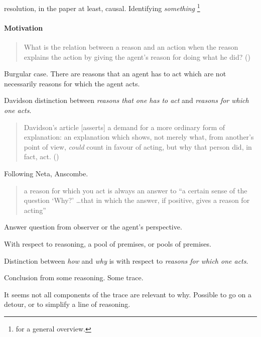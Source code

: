 \begin{note}
  \citeauthor{Davidson:1963aa} resolution, in the \citeyear{Davidson:1963aa} paper at least, causal.
  Identifying \emph{something}%
  \footnote{
    \textcite{Hieronymi:2011aa} for a general overview.
  }
\end{note}

\paragraph*{Motivation}

\begin{note}
  \begin{quote}
    What is the relation between a reason and an action when the reason explains the action by giving the agent's reason for doing what he did?%
    \mbox{}\hfill\mbox{({\citeyear[685]{Davidson:1963aa}})}
  \end{quote}

  Burgular case.
  There are reasons that an agent has to act which are not necessarily reasons for which the agent acts.

  Davidson distinction between \emph{reasons that one has to act} and \emph{reasons for which one acts}.

  \begin{quote}
    Davidson's article [asserts] a demand for a more ordinary form of explanation: an explanation which shows, not merely what, from another's point of view, \emph{could} count in favour of acting, but why that person did, in fact, act.%
    \mbox{}\hfill\mbox{(\citeyear[417]{Hieronymi:2011aa})}
  \end{quote}

  Following Neta, Anscombe.

  \begin{quote}
    a reason for which you act is always an answer to “a certain sense of the question ‘Why?' \dots that in which the answer, if positive, gives a reason for acting”
  \end{quote}

  Answer question from observer or the agent's perspective.

  With respect to reasoning, a pool of premises, or pools of premises.

  Distinction between \emph{how} and \emph{why} is with respect to \emph{reasons for which one acts}.

  Conclusion from some reasoning.
  Some trace.

  It seems not all components of the trace are relevant to why.
  Possible to go on a detour, or to simplify a line of reasoning.
\end{note}

